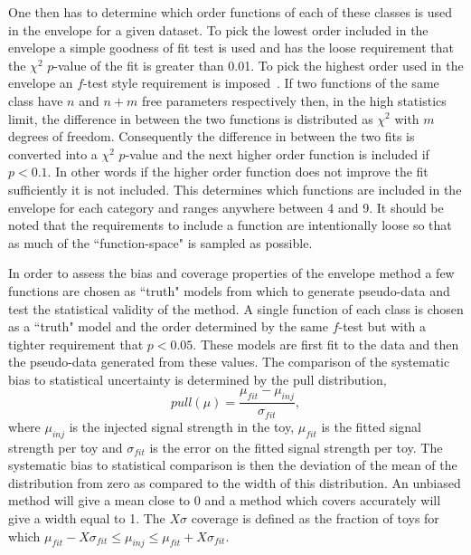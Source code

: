 One then has to determine which order functions of each of these classes is used in the envelope for a given dataset. To pick the lowest order included in the envelope a simple goodness of fit test is used and has the loose requirement that the $\chi^{2}$ $p$-value of the fit is greater than 0.01. To pick the highest order used in the envelope an $f$-test style requirement is imposed~\cite{ftest}. If two functions of the same class have $n$ and $n+m$ free parameters respectively then, in the high statistics limit, the difference in \NLL between the two functions is distributed as $\chi^{2}$ with $m$ degrees of freedom. Consequently the difference in \NLL between the two fits is converted into a $\chi^{2}$ $p$-value and the next higher order function is included if $p<0.1$. In other words if the higher order function does not improve the fit sufficiently it is not included. This determines which functions are included in the envelope for each category and ranges anywhere between 4 and 9. It should be noted that the requirements to include a function are intentionally loose so that as much of the ``function-space" is sampled as possible.

In order to assess the bias and coverage properties of the envelope method a few functions are chosen as ``truth" models from which to generate pseudo-data and test the statistical validity of the method. A single function of each class is chosen as a ``truth" model and the order determined by the same $f$-test but with a tighter requirement that $p<0.05$. These models are first fit to the data and then the pseudo-data generated from these values. The comparison of the systematic bias to statistical uncertainty is determined by the pull distribution,
\begin{equation}
  pull(\mu) = \frac{\mu_{fit} - \mu_{inj}}{\sigma_{fit}},
\end{equation}
where $\mu_{inj}$ is the injected signal strength in the toy, $\mu_{fit}$ is the fitted signal strength per toy and $\sigma_{fit}$ is the error on the fitted signal strength per toy. The systematic bias to statistical comparison is then the deviation of the mean of the distribution from zero as compared to the width of this distribution. An unbiased method will give a mean close to 0 and a method which covers accurately will give a width equal to 1. The $X\sigma$ coverage is defined as the fraction of toys for which $\mu_{fit}-X\sigma_{fit}\leq\mu_{inj}\leq\mu_{fit}+X\sigma_{fit}$.

